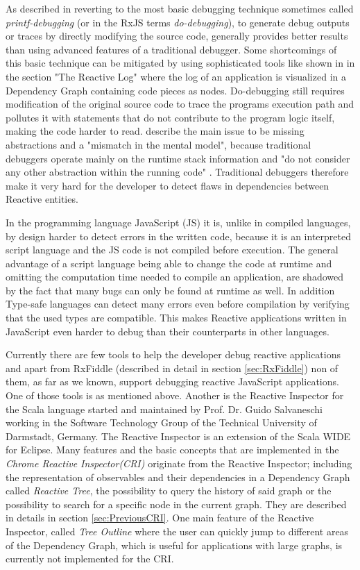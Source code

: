 As described in \cite{MSDN_DebugginObservables} reverting to the most basic debugging technique sometimes called \emph{printf-debugging} (or in the RxJS terms \emph{do-debugging}), to generate debug outputs or traces by directly modifying the source code, generally provides better results than using advanced features of a traditional debugger. Some shortcomings of this basic technique can be mitigated by using sophisticated tools like shown in \cite{ShinyGraphFromLog} in the section "The Reactive Log" where the log of an application is visualized in a Dependency Graph containing code pieces as nodes. Do-debugging still requires modification of the original source code to trace the programs execution path and pollutes it with statements that do not contribute to the program logic itself, making the code harder to read. \cite{PaperReactiveProgramming} describe the main issue to be missing abstractions and a "mismatch in the mental model", because traditional debuggers operate mainly on the runtime stack information and "do not consider any other abstraction within the running code" \cite{ThesisAbbas}. Traditional debuggers therefore make it very hard for the developer to detect flaws in dependencies between Reactive entities.

In the programming language JavaScript (JS) it is, unlike in compiled languages, by design harder to detect errors in the written code, because it is an interpreted script language and the JS code is not compiled before execution. The general advantage of a script language being able to change the code at runtime and omitting the computation time needed to compile an application, are shadowed by the fact that many bugs can only be found at runtime as well. In addition Type-safe languages can detect many errors even before compilation by verifying that the used types are compatible. This makes Reactive applications written in JavaScript even harder to debug than their counterparts in other languages.

Currently there are few tools to help the developer debug reactive applications and apart from RxFiddle (described in detail in section \ref{sec:RxFiddle}) non of them, as far as we known, support debugging reactive JavaScript applications. One of those tools is \cite{ShinyGraphFromLog} as mentioned above. Another is the Reactive Inspector for the Scala language \cite{ReactiveInspector} started and maintained by Prof. Dr. Guido Salvaneschi working in the Software Technology Group of the Technical University of Darmstadt, Germany.
The Reactive Inspector is an extension of the Scala WIDE for Eclipse. Many features and the basic concepts that are implemented in the \emph{Chrome Reactive Inspector(CRI)} originate from the Reactive Inspector; including the representation of observables and their dependencies in a Dependency Graph called \emph{Reactive Tree}, the possibility to query the history of said %
 graph or the possibility to search for a specific node in the current graph. They are described in details in section \ref{sec:PreviousCRI}. One main feature of the Reactive Inspector, called \emph{Tree Outline} where the user can quickly jump to different areas of the Dependency Graph, which is useful for applications with large graphs, is currently not implemented for the CRI.

